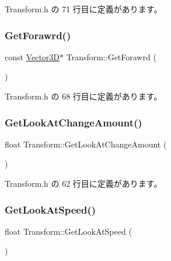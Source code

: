  Transform.\+h の 71 行目に定義があります。

\mbox{\label{class_transform_a25e4832e15334d74ff847f0ff0b3564f}} 
\subsubsection{\texorpdfstring{Get\+Forawrd()}{GetForawrd()}}
{\footnotesize\ttfamily const \mbox{\hyperlink{class_vector3_d}{Vector3D}}$\ast$ Transform\+::\+Get\+Forawrd (\begin{DoxyParamCaption}{ }\end{DoxyParamCaption})\hspace{0.3cm}{\ttfamily [inline]}}



 Transform.\+h の 68 行目に定義があります。

\mbox{\label{class_transform_a14b7b06632d6a47e99dc67aecbd7acc7}} 
\subsubsection{\texorpdfstring{Get\+Look\+At\+Change\+Amount()}{GetLookAtChangeAmount()}}
{\footnotesize\ttfamily float Transform\+::\+Get\+Look\+At\+Change\+Amount (\begin{DoxyParamCaption}{ }\end{DoxyParamCaption})\hspace{0.3cm}{\ttfamily [inline]}}



 Transform.\+h の 62 行目に定義があります。

\mbox{\label{class_transform_a79fdb2cb4eb1e4abf48e0f9fd74707ba}} 
\subsubsection{\texorpdfstring{Get\+Look\+At\+Speed()}{GetLookAtSpeed()}}
{\footnotesize\ttfamily float Transform\+::\+Get\+Look\+At\+Speed (\begin{DoxyParamCaption}{ }\end{DoxyParamCaption})\hspace{0.3cm}{\ttfamily [inline]}}



